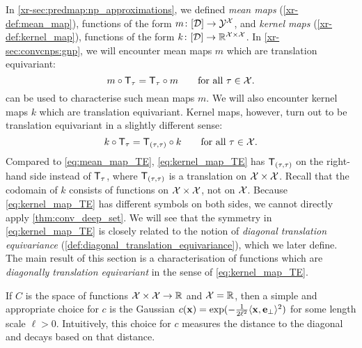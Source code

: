 \documentclass[12pt, twoside]{report}
\newcommand{\xrprefix}[1]{xr-#1}
\begin{document}
In \cref{\xrprefix{sec:predmap:np_approximations}}, 
we defined
\emph{mean maps} (\cref{\xrprefix{def:mean_map}}),
functions of the form $m \colon [\mathcal{D}] \to \mathcal{Y}^{\mathcal{X}}$,
and  \emph{kernel maps} (\cref{\xrprefix{def:kernel_map}}), functions of the form $k \colon [\mathcal{D}] \to \mathbb{R}^{\mathcal{X} \times \mathcal{X}}$.
In \cref{\xrprefix{sec:convcnps:gnp}}, we will encounter mean maps $m$ which are translation equivariant:
\begin{equation} \label{eq:mean_map_TE}
    m \comp \T_\tau = \T_\tau \comp m \qquad \text{for all $\tau \in \X$}.
\end{equation}
 can be used to characterise such mean maps $m$.
We will also encounter kernel maps $k$ which are translation equivariant.
Kernel maps, however, turn out to be translation equivariant in a slightly different sense:%
\begin{equation} \label{eq:kernel_map_TE}
    k \comp \T_{\tau} = \T_{(\tau, \tau)} \comp k \qquad \text{for all $\tau \in \X$}.
\end{equation}
Compared to \eqref{eq:mean_map_TE}, \eqref{eq:kernel_map_TE} has $\T_{(\tau, \tau)}$ on the right-hand side instead of $\T_\tau$, where $\T_{(\tau, \tau)}$ is a translation on $\mathcal{X} \times \mathcal{X}$.
Recall that
the codomain of $k$ consists of functions on $\mathcal{X} \times \mathcal{X}$, not on $\mathcal{X}$.
Because \eqref{eq:kernel_map_TE} has different symbols on both sides, we cannot directly apply \cref{thm:conv_deep_set}.
We will see that the symmetry in \eqref{eq:kernel_map_TE} is closely related to the notion of \emph{diagonal translation equivariance} (\cref{def:diagonal_translation_equivariance}), which we later define.
The main result of this section is a characterisation of functions which are \emph{diagonally translation equivariant} in the sense of \eqref{eq:kernel_map_TE}.

\begingroup
    \newcommand{\maybeprefix}[1]{#1}
\endgroup

If $C$ is the space of functions $\mathcal{X} \times \mathcal{X} \to \mathbb{R}$ and $\mathcal{X} = \mathbb{R}$, then a simple and appropriate choice for $c$ is the Gaussian $c(\mathbf{x}) = \exp(-\tfrac1{2\ell^2}\langle\mathbf{x},\mathbf{e}_\perp\rangle^2)$ for some length scale $\ell > 0$.
Intuitively, this choice for $c$ measures the distance to the diagonal and decays based on that distance.
\end{document}
